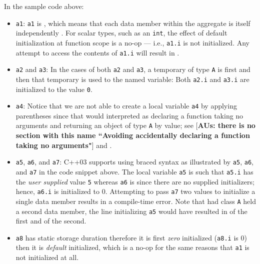 \noindent In the sample code above:
\begin{itemize}
\item{\lstinline!a1!: \lstinline!a1! is , which means that each data member within the aggregate is itself independently . For scalar types, such as an \lstinline!int!, the effect of default initialization at function scope is a no-op — i.e., \lstinline!a1.i! is not initialized. Any attempt to access the contents of \lstinline!a1.i! will result in .}
\item{\lstinline!a2! and \lstinline!a3!: In the cases of both \lstinline!a2! and \lstinline!a3!, a temporary of type \lstinline!A! is first  and then that temporary is used to  the named variable: Both \lstinline!a2.i! and \lstinline!a3.i! are initialized to the value \lstinline!0!.}
\item{\lstinline!a4!: Notice that we are not able to create a  local variable \lstinline!a4! by applying parentheses since that would interpreted as declaring a function taking no arguments and returning an object of type \lstinline!A! by value; see  [\textbf{AUs: there is no section with this name ``Avoiding accidentally declaring a function taking no arguments"}] 
and .}
\item{\lstinline!a5!, \lstinline!a6!, and \lstinline!a7!: C++03 supports  using braced syntax as illustrated by \lstinline!a5!, \lstinline!a6!, and \lstinline!a7! in the code snippet above. The local variable \lstinline!a5! is  such that \lstinline!a5.i! has the \emph{user supplied} value \lstinline!5! whereas \lstinline!a6! is  since there are no supplied initializers; hence, \lstinline!a6.i! is initialized to 0. Attempting to pass \lstinline!a7! two values to initialize a single data member results in a compile-time error. Note that had class \lstinline!A! held a second data member, the line initializing \lstinline!a5! would have resulted in  of the first and  of the second.}
\item{\lstinline!a8! has static storage duration therefore it is first \emph{zero} initialized (\lstinline!a8.i! is 0) then it is \emph{default} initialized, which is a no-op for the same reasons that \lstinline!a1! is not initialized at all.}
\end{itemize}


